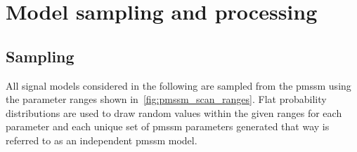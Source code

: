 \section{Model sampling and processing}\label{sec:pmssm_sampling}


\subsection{Sampling}

All signal models considered in the following are sampled from the \gls{pmssm} using the parameter ranges shown in~\cref{fig:pmssm_scan_ranges}. Flat probability distributions are used to draw random values within the given ranges for each parameter and each unique set of \gls{pmssm} parameters generated that way is referred to as an independent \gls{pmssm} model. 


